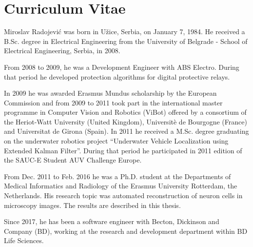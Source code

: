 %
%

\noquote
\orgchpos
\chapter*{Curriculum Vitae}

\noindent
Miroslav Radojevi\'{c} was born in U\v{z}ice, Serbia, on January 7, 1984. He received a B.Sc. degree in Electrical Engineering from the University of Belgrade - School of Electrical Engineering, Serbia, in 2008.
\bigskip

\noindent
From 2008 to 2009, he was a Development Engineer with ABS Electro. During that period he developed protection algorithms for digital protective relays.
\bigskip

\noindent 
In 2009 he was awarded Erasmus Mundus scholarship by the European Commission and from 2009 to 2011 took part in the international master programme in Computer Vision and Robotics (ViBot) offered by a consortium of the Heriot-Watt University (United Kingdom), Universit\`{e} de Bourgogne (France) and Universitat de Girona (Spain). In 2011 he received a M.Sc. degree graduating on the underwater robotics project ``Underwater Vehicle Localization using Extended Kalman Filter''. During that period he participated in 2011 edition of the SAUC-E Student AUV Challenge Europe.  
\bigskip

\noindent
From Dec. 2011 to Feb. 2016 he was a Ph.D. student at the Departments of Medical Informatics and Radiology of the Erasmus University Rotterdam, the Netherlands. His research topic was automated reconstruction of neuron cells in microscopy images. The results are described in this thesis.
\bigskip

\noindent
Since 2017, he has been a software engineer with Becton, Dickinson and Company (BD), working at the research and development department within BD Life Sciences.